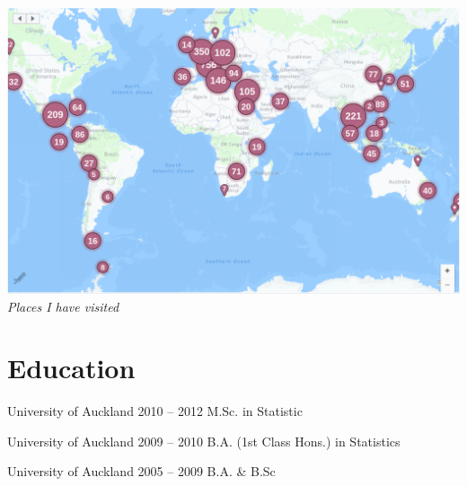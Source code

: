 \documentclass{tccv}
\begin{document}
\FloatBarrier
  \centering
  \includegraphics[scale = 0.2]{places_I_have_been_2.png}
  \textit{Places I have visited}
\FloatBarrier


\section{Education}

\begin{yearlist}
  
\item[University of Auckland]{2010 -- 2012}
     {M.Sc. in Statistic}
{}

\item[University of Auckland]{2009 -- 2010}
     {B.A. (1st Class Hons.) \newline in Statistics}
{}

\item[University of Auckland]{2005 -- 2009}
  {B.A. \& B.Sc}
  {}

\end{yearlist}
\end{document}
